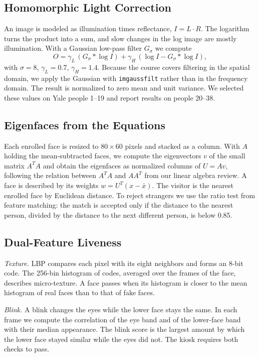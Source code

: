 \documentclass[conference,a4paper]{IEEEtran}
\begin{document}
\subsection{Homomorphic Light Correction}
An image is modeled as illumination times reflectance, $I = L \cdot R$. The logarithm turns the product into a sum, and slow changes in the log image are mostly illumination. With a Gaussian low-pass filter $G_\sigma$ we compute
\begin{equation}
O = \gamma_L \, (G_\sigma * \log I) + \gamma_H \, (\log I - G_\sigma * \log I),
\end{equation}
with $\sigma=8$, $\gamma_L=0.7$, $\gamma_H=1.4$. Because the course covers filtering in the spatial domain, we apply the Gaussian with \texttt{imgaussfilt} rather than in the frequency domain. The result is normalized to zero mean and unit variance. We selected these values on Yale people 1--19 and report results on people 20--38.

\subsection{Eigenfaces from the Equations}
Each enrolled face is resized to $80\times60$ pixels and stacked as a column. With $A$ holding the mean-subtracted faces, we compute the eigenvectors $v$ of the small matrix $A^TA$ and obtain the eigenfaces as normalized columns of $U = Av$, following the relation between $A^TA$ and $AA^T$ from our linear algebra review. A face is described by its weights $w = U^T(x - \bar{x})$. The visitor is the nearest enrolled face by Euclidean distance. To reject strangers we use the ratio test from feature matching: the match is accepted only if the distance to the nearest person, divided by the distance to the next different person, is below 0.85.

\subsection{Dual-Feature Liveness}
\emph{Texture.} LBP compares each pixel with its eight neighbors and forms an 8-bit code. The 256-bin histogram of codes, averaged over the frames of the face, describes micro-texture. A face passes when its histogram is closer to the mean histogram of real faces than to that of fake faces.

\emph{Blink.} A blink changes the eyes while the lower face stays the same. In each frame we compute the correlation of the eye band and of the lower-face band with their median appearance. The blink score is the largest amount by which the lower face stayed similar while the eyes did not. The kiosk requires both checks to pass.
\end{document}
